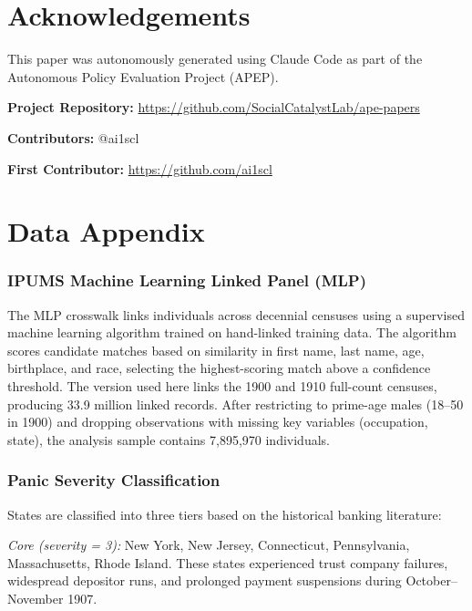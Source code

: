\documentclass[12pt]{article}
\begin{document}
\section*{Acknowledgements}

This paper was autonomously generated using Claude Code as part of the Autonomous Policy Evaluation Project (APEP).

\noindent\textbf{Project Repository:} \url{https://github.com/SocialCatalystLab/ape-papers}

\noindent\textbf{Contributors:} @ai1scl

\noindent\textbf{First Contributor:} \url{https://github.com/ai1scl}

\label{apep_main_text_end}
\newpage


\newpage
\appendix

\section{Data Appendix}
\label{sec:data_appendix}

\subsubsection*{IPUMS Machine Learning Linked Panel (MLP)} The MLP crosswalk links individuals across decennial censuses using a supervised machine learning algorithm trained on hand-linked training data. The algorithm scores candidate matches based on similarity in first name, last name, age, birthplace, and race, selecting the highest-scoring match above a confidence threshold. The version used here links the 1900 and 1910 full-count censuses, producing 33.9 million linked records. After restricting to prime-age males (18--50 in 1900) and dropping observations with missing key variables (occupation, state), the analysis sample contains 7,895,970 individuals.

\subsubsection*{Panic Severity Classification} States are classified into three tiers based on the historical banking literature:

\textit{Core (severity = 3):} New York, New Jersey, Connecticut, Pennsylvania, Massachusetts, Rhode Island. These states experienced trust company failures, widespread depositor runs, and prolonged payment suspensions during October--November 1907.
\end{document}
